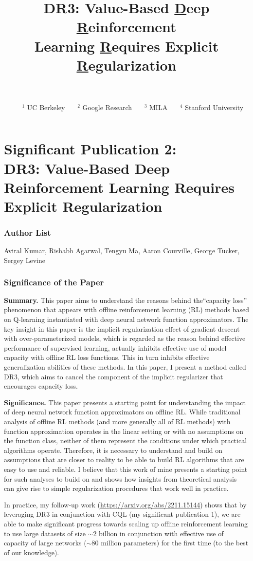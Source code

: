 \documentclass{article} %
\title{DR3: Value-Based \underline{D}eep \underline{R}einforcement\\ Learning \underline{R}equires Explicit \underline{R}egularization}
\author{
 \quad \quad \quad \quad \quad \quad \quad \quad \quad \quad \quad {Aviral Kumar$^{1, 2}$~~~~ Rishabh Agarwal$^{2, 3}$} \vspace{0.05cm}\\
\quad \quad \quad \quad \quad \quad {\textbf{Tengyu Ma$^{4}$~~~ Aaron Courville$^{3}$~~~ George Tucker$^{2}$~~~ Sergey Levine$^{1,2}$}} \vspace{0.1cm}\\
\quad \quad \quad \quad \quad ~~~ {$^1$ UC Berkeley~~~ $^2$ Google Research~~~ $^3$ MILA~~~ $^4$ Stanford University} \vspace{0.05cm}\\
\quad \quad \quad \quad \quad \quad \quad \quad \quad \quad \quad \quad \quad \quad \quad {\texttt{aviralk@berkeley.edu}}
}
\begin{document}
\part*{\Large{Significant Publication 2: \\ DR3: Value-Based Deep Reinforcement Learning Requires Explicit Regularization}}

\section*{Author List} Aviral Kumar, Rishabh Agarwal, Tengyu Ma, Aaron Courville, George Tucker, Sergey Levine

\section*{Significance of the Paper} 

{\textbf{Summary.}} This paper aims to understand the reasons behind the``capacity loss'' phenomenon that appears with offline reinforcement learning (RL) methods based on Q-learning instantiated with deep neural network function approximators. The key insight in this paper is the implicit regularization effect of gradient descent with over-parameterized models, which is regarded as the reason behind effective performance of supervised learning, actually inhibits effective use of model capacity with offline RL loss functions. This in turn inhibits effective generalization abilities of these methods. In this paper, I present a method called DR3, which aims to cancel the component of the implicit regularizer that encourages capacity loss.

\textbf{Significance.} This paper presents a starting point for understanding the impact of deep neural network function approximators on offline RL. While traditional analysis of offline RL methods (and more generally all of RL methods) with function approximation operates in the linear setting or with no assumptions on the function class, neither of them represent the conditions under which practical algorithms operate. Therefore, it is necessary to understand and build on assumptions that are closer to reality to be able to build RL algorithms that are easy to use and reliable. I believe that this work of mine presents a starting point for such analyses to build on and shows how insights from theoretical analysis can give rise to simple regularization procedures that work well in practice. 

In practice, my follow-up work (\url{https://arxiv.org/abs/2211.15144}) shows that by leveraging DR3 in conjunction with CQL (my significant publication 1), we are able to make significant progress towards scaling up offline reinforcement learning to use large datasets of size $\sim$2 billion in conjunction with effective use of capacity of large networks ($\sim$80 million parameters) for the first time (to the best of our knowledge).   
\end{document}
